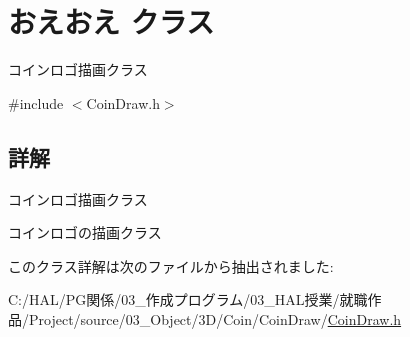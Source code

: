 \hypertarget{class_xE3_x81_x8A_xE3_x81_x88_xE3_x81_x8A_xE3_x81_x88}{}\section{おえおえ クラス}
\label{class_xE3_x81_x8A_xE3_x81_x88_xE3_x81_x8A_xE3_x81_x88}


コインロゴ描画クラス  




{\ttfamily \#include $<$Coin\+Draw.\+h$>$}



\subsection{詳解}
コインロゴ描画クラス 

コインロゴの描画クラス 

このクラス詳解は次のファイルから抽出されました\+:\begin{DoxyCompactItemize}
\item 
C\+:/\+H\+A\+L/\+P\+G関係/03\+\_\+作成プログラム/03\+\_\+\+H\+A\+L授業/就職作品/\+Project/source/03\+\_\+\+Object/3\+D/\+Coin/\+Coin\+Draw/\mbox{\hyperlink{_coin_draw_8h}{Coin\+Draw.\+h}}\end{DoxyCompactItemize}
